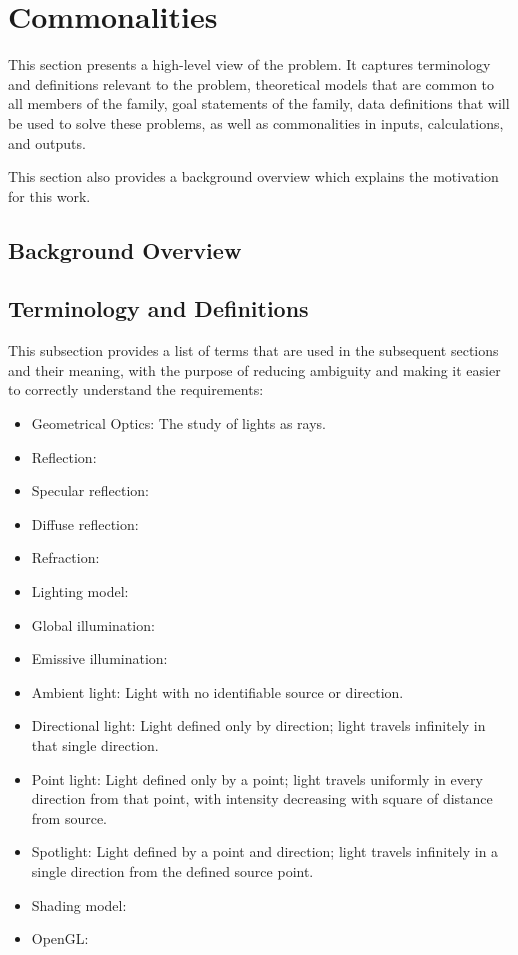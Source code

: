 \documentclass[12pt]{article}
\begin{document}
\section{Commonalities}
This section presents a high-level view of the problem. It captures terminology 
and definitions relevant to the problem, theoretical models that are common to 
all members of the family, goal statements of the family, data definitions that 
will be used to solve these problems, as well as commonalities in inputs, 
calculations, and outputs.

This section also provides a background overview which explains the motivation 
for this work.

\subsection{Background Overview} \label{Sec_Background}

\subsection{Terminology and  Definitions}
This subsection provides a list of terms that are used in the subsequent
sections and their meaning, with the purpose of reducing ambiguity and making it
easier to correctly understand the requirements:

\begin{itemize}

\item Geometrical Optics: The study of lights as rays.
\item Reflection:
\item Specular reflection:
\item Diffuse reflection:
\item Refraction:
\item Lighting model:
\item Global illumination:
\item Emissive illumination:
\item Ambient light: Light with no identifiable source or direction.
\item Directional light: Light defined only by direction; light travels 
infinitely in that single direction.
\item Point light: Light defined only by a point; light travels uniformly in 
every direction from that point, with intensity decreasing with square of 
distance from source.
\item Spotlight: Light defined by a point and direction; light travels 
infinitely in a single direction from the defined source point.
\item Shading model:
\item OpenGL:

\end{itemize}
\end{document}
